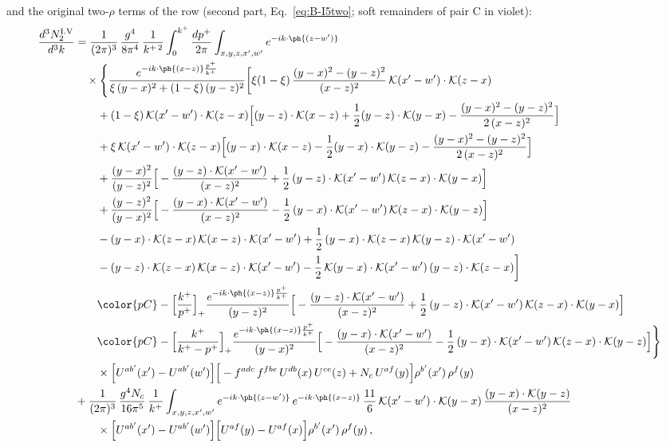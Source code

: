 and the original two-$\rho$ terms of the row (second part, Eq.~\eqref{eq:B-I5two}; soft remainders of pair C in violet):
\begin{align}
\frac{d^{3}N^{\rm I.V}_{2}}{d^{3}k} & =\frac{1}{(2\pi)^{3}}\,\frac{g^{4}}{8\pi^{4}}\,\frac{1}{k^{+\,2}}\int_{0}^{k^{+}}\frac{dp^{+}}{2\pi}\int_{x,y,z,x',w'}e^{-ik\cdot\ph{(z-w')}}\notag\\
&\quad\times\Bigg\{\frac{e^{-ik\cdot\ph{(x-z)}\frac{p^{+}}{k^{+}}}}{\xi\,(y-x)^{2}+(1-\xi)\,(y-z)^{2}}\bigg[\xi(1-\xi)\,\frac{(y-x)^{2}-(y-z)^{2}}{(x-z)^{2}}\,\mathcal{K}(x'-w')\cdot\mathcal{K}(z-x)\notag\\
&\qquad+(1-\xi)\,\mathcal{K}(x'-w')\cdot\mathcal{K}(z-x)\Big[(y-z)\cdot\mathcal{K}(x-z)+\frac{1}{2}(y-z)\cdot\mathcal{K}(y-x)-\frac{(y-x)^{2}-(y-z)^{2}}{2\,(x-z)^{2}}\Big]\notag\\
&\qquad+\xi\,\mathcal{K}(x'-w')\cdot\mathcal{K}(z-x)\Big[(y-x)\cdot\mathcal{K}(x-z)-\frac{1}{2}(y-x)\cdot\mathcal{K}(y-z)-\frac{(y-x)^{2}-(y-z)^{2}}{2\,(x-z)^{2}}\Big]\notag\\
&\qquad+\frac{(y-x)^{2}}{(y-z)^{2}}\Big[-\frac{(y-z)\cdot\mathcal{K}(x'-w')}{(x-z)^{2}}+\frac{1}{2}\,(y-z)\cdot\mathcal{K}(x'-w')\,\mathcal{K}(z-x)\cdot\mathcal{K}(y-x)\Big]\notag\\
&\qquad+\frac{(y-z)^{2}}{(y-x)^{2}}\Big[-\frac{(y-x)\cdot\mathcal{K}(x'-w')}{(x-z)^{2}}-\frac{1}{2}\,(y-x)\cdot\mathcal{K}(x'-w')\,\mathcal{K}(z-x)\cdot\mathcal{K}(y-z)\Big]\notag\\
&\qquad-(y-x)\cdot\mathcal{K}(z-x)\,\mathcal{K}(x-z)\cdot\mathcal{K}(x'-w')+\frac{1}{2}\,(y-x)\cdot\mathcal{K}(z-x)\,\mathcal{K}(y-z)\cdot\mathcal{K}(x'-w')\notag\\
&\qquad-(y-z)\cdot\mathcal{K}(z-x)\,\mathcal{K}(x-z)\cdot\mathcal{K}(x'-w')-\frac{1}{2}\,\mathcal{K}(y-x)\cdot\mathcal{K}(x'-w')\,(y-z)\cdot\mathcal{K}(z-x)\bigg]\notag\\
&\qquad{\color{pC}-\Big[\frac{k^{+}}{p^{+}}\Big]_{+}\frac{e^{-ik\cdot\ph{(x-z)}\frac{p^{+}}{k^{+}}}}{(y-z)^{2}}\Big[-\frac{(y-z)\cdot\mathcal{K}(x'-w')}{(x-z)^{2}}+\frac{1}{2}\,(y-z)\cdot\mathcal{K}(x'-w')\,\mathcal{K}(z-x)\cdot\mathcal{K}(y-x)\Big]}\notag\\
&\qquad{\color{pC}-\Big[\frac{k^{+}}{k^{+}-p^{+}}\Big]_{+}\frac{e^{-ik\cdot\ph{(x-z)}\frac{p^{+}}{k^{+}}}}{(y-x)^{2}}\Big[-\frac{(y-x)\cdot\mathcal{K}(x'-w')}{(x-z)^{2}}-\frac{1}{2}\,(y-x)\cdot\mathcal{K}(x'-w')\,\mathcal{K}(z-x)\cdot\mathcal{K}(y-z)\Big]}\Bigg\}\notag\\
&\qquad\times\Big[U^{ab'}(x')-U^{ab'}(w')\Big]\Big[-f^{adc}\,f^{fbe}\,U^{db}(x)\,U^{ce}(z)+N_{c}\,U^{af}(y)\Big]\rho^{b'}(x')\,\rho^{f}(y)\notag\\
&+\frac{1}{(2\pi)^{3}}\,\frac{g^{4}N_{c}}{16\pi^{5}}\,\frac{1}{k^{+}}\int_{x,y,z,x',w'}e^{-ik\cdot\ph{(z-w')}}\,e^{-ik\cdot\ph{(x-z)}}\,\frac{11}{6}\,\mathcal{K}(x'-w')\cdot\mathcal{K}(y-x)\,\frac{(y-x)\cdot\mathcal{K}(y-z)}{(x-z)^{2}}\notag\\
&\qquad\times\Big[U^{ab'}(x')-U^{ab'}(w')\Big]\Big[U^{af}(y)-U^{af}(x)\Big]\rho^{b'}(x')\,\rho^{f}(y)\,,\label{eq:D-I.V-2o}
\end{align}
